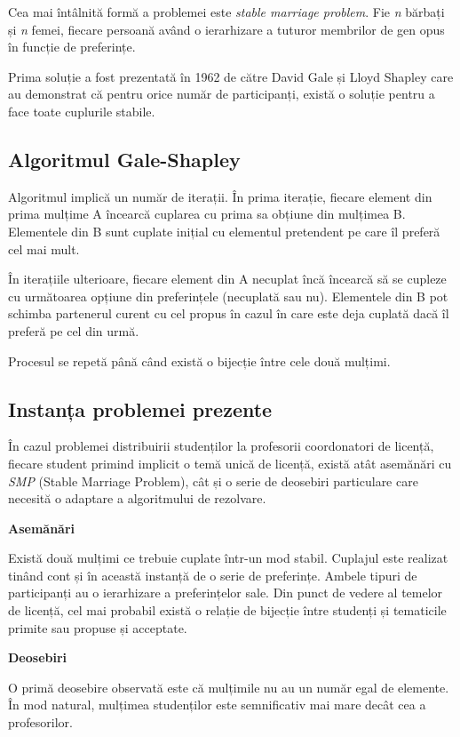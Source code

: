 Cea mai întâlnită formă a problemei este \textit{stable marriage problem}. Fie \textit{n} bărbați și \textit{n} femei, fiecare persoană având o ierarhizare a tuturor membrilor de gen opus în funcție de preferințe. 

Prima soluție a fost prezentată în 1962 de către David Gale și Lloyd Shapley care au demonstrat că pentru orice număr de participanți, există o soluție pentru a face toate cuplurile stabile.

\subsection{Algoritmul Gale-Shapley}
Algoritmul implică un număr de iterații. În prima iterație, fiecare element din prima mulțime A încearcă cuplarea cu prima sa obțiune din mulțimea B. Elementele din B sunt cuplate inițial cu elementul pretendent pe care îl preferă cel mai mult.

În iterațiile ulterioare, fiecare element din A necuplat încă încearcă să se cupleze cu următoarea opțiune din preferințele (necuplată sau nu). Elementele din B pot schimba partenerul curent cu cel propus în cazul în care este deja cuplată dacă îl preferă pe cel din urmă.

Procesul se repetă până când există o bijecție între cele două mulțimi.

\subsection{Instanța problemei prezente}
În cazul problemei distribuirii studenților la profesorii coordonatori de licență, fiecare student primind implicit o temă unică de licență, există atât asemănări cu \textit{SMP} (Stable Marriage Problem), cât și o serie de deosebiri particulare care necesită o adaptare a algoritmului de rezolvare.

\textbf{Asemănări}

Există două mulțimi ce trebuie cuplate într-un mod stabil. Cuplajul este realizat tinând cont și în această instanță de o serie de preferințe. Ambele tipuri de participanți au o ierarhizare a preferințelor sale. Din punct de vedere al temelor de licență, cel mai probabil există o relație de bijecție între studenți și tematicile primite sau propuse și acceptate.

\textbf{Deosebiri}

O primă deosebire observată este că mulțimile nu au un număr egal de elemente. În mod natural, mulțimea studenților este semnificativ mai mare decât cea a profesorilor.

